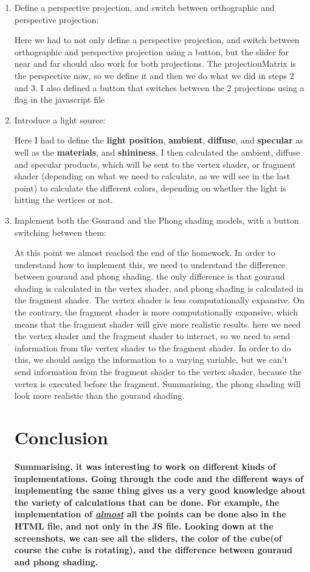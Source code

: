 \documentclass{article}
\begin{document}
\begin{enumerate}
\item Define a perspective projection, and switch between orthographic and perspective projection:

Here we had to not only define a perspective projection, and switch between orthographic and perspective projection using a button, but the slider for near and far should also work for both projections.
The projectionMatrix is the perspective now, so we define it and then we do what we did in steps 2 and 3. I also defined a button that switches between the 2 projections using a flag in the javascript file 

\item Introduce a light source:

Here I had to define the \textbf{light position}, \textbf{ambient}, \textbf{diffuse}, and \textbf{specular} as well as the \textbf{materials}, and \textbf{shininess}. I then calculated the ambient, diffuse and specular products, which will be sent to the vertex shader, or fragment shader (depending on what we need to calculate, as we will see in the last point) to calculate the different colors, depending on whether the light is hitting the vertices or not.

\item Implement both the Gouraud and the Phong shading models, with a button switching between
them:

At this point we almost reached the end of the homework. In order to understand how to implement this, we need to understand the difference between gouraud and phong shading. the only difference is that gouraud shading is calculated in the vertex shader, and phong shading is calculated in the fragment shader. The vertex shader is less computationally expansive. On the contrary, the fragment shader is more computationally expansive, which means that the fragment shader will give more realistic results. here we need the vertex shader and the fragment shader to interact, so we need to send information from the vertex shader to the fragment shader. In order to do this, we should assign the information to a varying variable, but we can't send information from the fragment shader to the vertex shader, because the vertex is executed before the fragment. Summarising, the phong shading will look more realistic than the gouraud shading.

\section {Conclusion}
\textbf{Summarising, it was interesting to work on different kinds of implementations. Going through the code and the different ways of implementing the same thing gives us a very good knowledge about the variety of calculations that can be done. For example, the implementation of \textit{\underline{almost}} all the points can be done also in the HTML file, and not only in the JS file. Looking down at the screenshots, we can see all the sliders, the color of the cube(of course the cube is rotating), and the difference between gouraud and phong shading.}


\end{enumerate}
\end{document}
